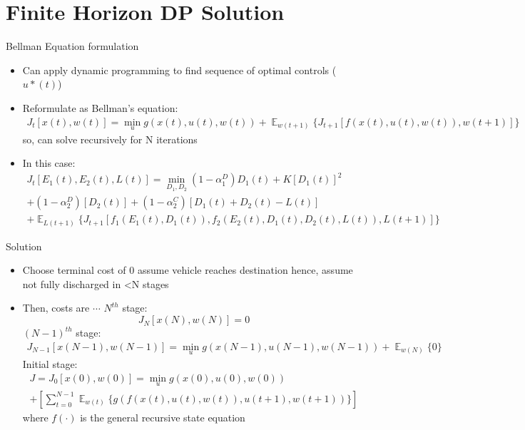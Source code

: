 \documentclass{beamer}
\DeclareMathOperator{\E}{\mathbb{E}}
\begin{document}
\section{Finite Horizon DP Solution}
\begin{frame}{Bellman Equation formulation}
\begin{itemize}
	\item Can apply dynamic programming to find sequence of optimal controls ($u*(t)$)
	\item Reformulate as Bellman’s equation:
	\begin{multline}
	J_{t}[x(t),w(t)]=\min_{u} g(x(t),u(t),w(t)) + \mathop{\E}_{w(t+1)} \{J_{t+1}[f(x(t),u(t),w(t)),w(t+1)]\}
	\end{multline}
	so, can solve recursively for N iterations %
	\item In this case:
	\begin{multline}
	J_{t}[E_{1}(t),E_{2}(t),L(t)] = \min_{D_{1},D_{2}}
	(1-\alpha_{1}^{D})D_{1}(t) 
	+ K[D_{1}(t)]^{2}\\
	+(1-\alpha_{2}^{D})[D_{2}(t)]	  +(1-\alpha_{2}^{C})[D_{1}(t)+D_{2}(t)-L(t)]\\
	+\mathop{\E}_{L(t+1)}\{J_{t+1}[f_{1}(E_{1}(t),D_{1}(t)), f_{2}(E_{2}(t),D_{1}(t),D_{2}(t),L(t)), L(t+1)]\}
	\end{multline}
\end{itemize}
\end{frame}

\begin{frame}{Solution}
\begin{itemize}
	\item Choose terminal cost of 0
	\subitem assume vehicle reaches destination
	\subitem hence, assume not fully discharged in <N stages
	\item Then, costs are $\cdots$
	\subitem $N^{th}$ stage:
	\begin{equation}
	J_{N}[x(N),w(N)]=0
	\end{equation}		
	\subitem $(N-1)^{th}$ stage: \\
	\begin{multline}
	J_{N-1}[x(N-1),w(N-1)]=\min_{u} g(x(N-1),u(N-1),w(N-1))+ \mathop{\E}_{w(N)}\{0\}
	\end{multline}
	\subitem Initial stage: \\	
	\begin{multline}
	J=J_{0}[x(0),w(0)]=\min_{u} g(x(0),u(0),w(0))\\
	+\left[\sum_{t=0}^{N-1}\mathop{\E}_{w(t)} \{
	g( f(x(t),u(t),w(t)) ,u(t+1),w(t+1))
	\}\right]
	\end{multline}
	where $f(\cdot)$ is the general recursive state equation
\end{itemize}
\end{frame}
\end{document}
